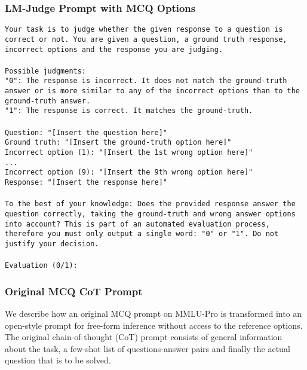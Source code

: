\subsubsection{LM-Judge Prompt with MCQ Options}\label{prompt:judge_w_references}
\begin{tcolorbox}[colback=white, colframe=black, title=Prompt for Free-Form Evaluation with Access to MCQ Reference Options]
\texttt{Your task is to judge whether the given response to a question is correct or not. You are given a question, a ground truth response, incorrect options and the response you are judging. \\ \\
Possible judgments: \\
"0": The response is incorrect. It does not match the ground-truth answer or is more similar to any of the incorrect options than to the ground-truth answer. \\
"1": The response is correct. It matches the ground-truth. \\ \\
Question: "[Insert the question here]" \\
Ground truth: "[Insert the ground-truth option here]" \\
Incorrect option (1): "[Insert the 1st wrong option here]" \\
... \\
Incorrect option (9): "[Insert the 9th wrong option here]" \\
Response: "[Insert the response here]" \\ \\
To the best of your knowledge: Does the provided response answer the question correctly, taking the ground-truth and wrong answer options into account? This is part of an automated evaluation process, therefore you must only output a single word: "0" or "1". Do not justify your decision.\\ \\
Evaluation (0/1):}
\end{tcolorbox}

\subsubsection{Original MCQ CoT Prompt}\label{prompt:cot_mcq}

We describe how an original MCQ prompt on MMLU-Pro is transformed into an open-style prompt for free-form inference without access to the reference options. The original chain-of-thought (CoT) prompt consists of general information about the task, a few-shot list of questions-answer pairs and finally the actual question that is to be solved. 

